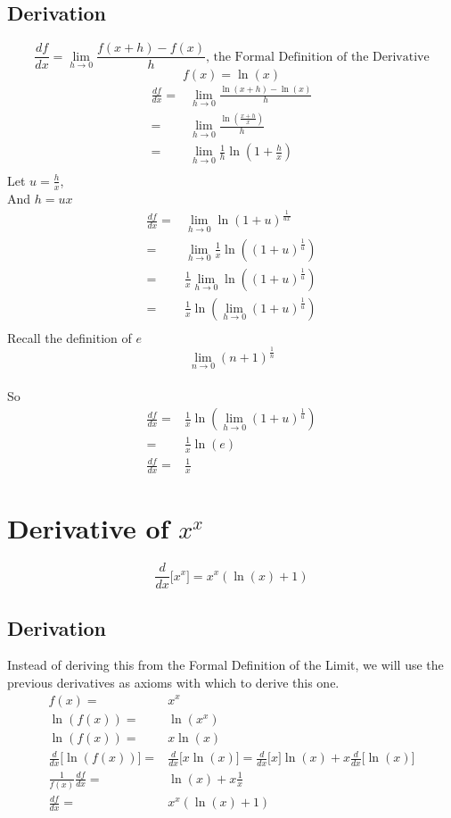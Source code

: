 \subsection{Derivation}
\[\frac{df}{dx} = \lim_{h\to0}\frac{f(x+h) -f(x)}{h}  \text{, the Formal Definition of the Derivative} \]
\[ f(x) = \ln{(x)} \]
\begin{align*}
\frac{df}{dx} =& \lim_{h\to0}\frac{\ln{(x+h)} - \ln(x)}{h} \\
=& \lim_{h\to0}\frac{ \ln{\left(\frac{x+h}{x}\right)} }{h} \\
=& \lim_{h\to0}\frac{1}{h} \ln{\left(1+ \frac{h}{x}\right)} \\
\end{align*}
Let \(u = \frac{h}{x}\), \\
And \(h = ux \) \\
\begin{align*}
\frac{df}{dx} =& \lim_{h\to0} \ln{\left(1+ u\right)^\frac{1}{ux}} \\
=& \lim_{h\to0} \frac{1}{x}\ln{\left((1+ u)^\frac{1}{u}\right)} \\
=&  \frac{1}{x}\lim_{h\to0}\ln{\left((1+ u)^\frac{1}{u}\right)} \\
=&  \frac{1}{x}\ln{\left(\lim_{h\to0}(1+ u)^\frac{1}{u}\right)} \\
\end{align*}
Recall the definition of \(e\)
\[\lim_{n\to0}(n+1)^{\frac{1}{n}}\]\\
So
\begin{align*}
\frac{df}{dx} =& \frac{1}{x}\ln{\left(\lim_{h\to0}(1+ u)^\frac{1}{u}\right)} \\
=& \frac{1}{x}\ln{(e)} \\
\frac{df}{dx} =& \frac{1}{x}
\end{align*}

\section{Derivative of $x^x$}
\[ \frac{d}{dx}\bigg[x^x \bigg] = x^x(\ln{(x)} + 1) \]

\subsection{Derivation}
Instead of deriving this from the Formal Definition of the Limit, we will use the previous derivatives as axioms with which to derive this one.
\begin{align*}
f(x)  =& x^x \\
\ln{(f(x))} =& \ln{(x^x)} \\
\ln{(f(x))} =& x\ln{(x)} \\
\frac{d}{dx}\bigg[\ln{(f(x))}\bigg] =& \frac{d}{dx} \bigg[ x\ln{(x)} \bigg] = \frac{d}{dx}\bigg[ x \bigg]\ln{(x)} + x\frac{d}{dx}\bigg[\ln{(x)} \bigg]\\
\frac{1}{f(x)}\frac{df}{dx} =&  \ln{(x)} + x\frac{1}{x} \\
\frac{df}{dx} =&  x^x(\ln{(x)} + 1)
\end{align*}
